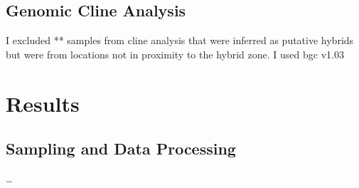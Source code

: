 \subsection{Genomic Cline Analysis}
I excluded ** samples from cline analysis that were inferred as putative hybrids
but were from locations not in proximity to the hybrid zone.
I used bgc v1.03 \parencite{gompert2012}







\section{Results}
\subsection{Sampling and Data Processing}
\ldots





